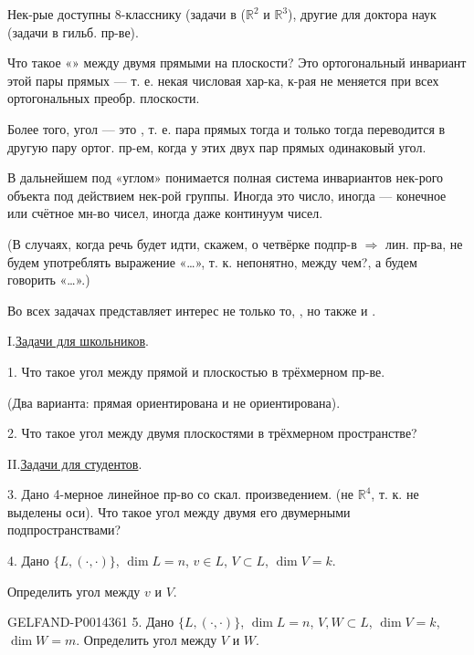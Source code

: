 Нек-рые доступны 8-класснику (задачи в (\(\mathbb R^2\) и \(\mathbb R^3\)),
другие для доктора наук (задачи в гильб. пр-ве).

Что такое «» между двумя прямыми на плоскости?
Это ортогональный инвариант этой пары прямых — т. е. некая числовая хар-ка, к-рая не меняется при всех ортогональных преобр. плоскости.

Более того, угол — это , т. е. пара прямых тогда и только тогда переводится в другую пару ортог. пр-ем, когда у этих двух пар прямых одинаковый угол.

В дальнейшем под «углом» понимается полная система инвариантов нек-рого объекта под действием нек-рой группы. Иногда это число, иногда — конечное или счётное мн-во чисел, иногда даже континуум чисел.

(В случаях, когда речь будет идти, скажем, о четвёрке подпр-в \(\Rightarrow\) лин. пр-ва,
не будем употреблять выражение «\ldots»,
т. к. непонятно, между чем?, а будем говорить «\ldots».)

Во всех задачах представляет интерес не только то, , но также и .

\par\noindent I.\quad\uline{Задачи для школьников}.

1. Что такое угол между прямой и плоскостью в трёхмерном пр-ве.

(Два варианта: прямая ориентирована и не ориентирована).

2. Что такое угол между двумя плоскостями в трёхмерном пространстве?

\par\noindent II.\quad\uline{Задачи для студентов}.

3. Дано 4-мерное линейное пр-во со скал. произведением. (не \(\mathbb R^4\), т. к. не выделены оси).
Что такое угол между двумя его двумерными подпространствами?

4. Дано \(\{L,(\cdot,\cdot)\}\), \(\dim L=n\), \(v\in L\),
\(V\subset L\), \(\dim V=k\).

Определить угол между \(v\) и \(V\).


\begin{GelfandAdjacentEvidence}{GELFAND-P001436}{1}
5. Дано \(\{L,(\cdot,\cdot)\}\), \(\dim L=n\), \(V,W\subset L\),
\(\dim V=k\), \(\dim W=m\). Определить угол между \(V\) и \(W\).
\end{GelfandAdjacentEvidence}


